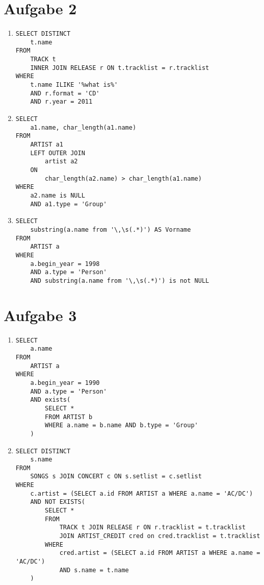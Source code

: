 \documentclass{article}
\begin{document}
    \section*{Aufgabe 2}
    \begin{enumerate}
        \item
            \begin{verbatim}
SELECT DISTINCT
    t.name
FROM
    TRACK t
    INNER JOIN RELEASE r ON t.tracklist = r.tracklist
WHERE
    t.name ILIKE '%what is%'
    AND r.format = 'CD'
    AND r.year = 2011
            \end{verbatim}
        \item
            \begin{verbatim}
SELECT
    a1.name, char_length(a1.name)
FROM
    ARTIST a1
    LEFT OUTER JOIN
        artist a2
    ON
        char_length(a2.name) > char_length(a1.name)
WHERE
    a2.name is NULL
    AND a1.type = 'Group'
            \end{verbatim}
        \item
            \begin{verbatim}
SELECT
    substring(a.name from '\,\s(.*)') AS Vorname
FROM
    ARTIST a
WHERE
    a.begin_year = 1998
    AND a.type = 'Person'
    AND substring(a.name from '\,\s(.*)') is not NULL
            \end{verbatim}
    \end{enumerate}

\section*{Aufgabe 3}
    \begin{enumerate}
        \item
            \begin{verbatim}
SELECT
    a.name
FROM
    ARTIST a
WHERE
    a.begin_year = 1990
    AND a.type = 'Person'
    AND exists(
        SELECT *
        FROM ARTIST b
        WHERE a.name = b.name AND b.type = 'Group'
    )
            \end{verbatim}
        \item
            \begin{verbatim}
SELECT DISTINCT
    s.name
FROM
    SONGS s JOIN CONCERT c ON s.setlist = c.setlist
WHERE
    c.artist = (SELECT a.id FROM ARTIST a WHERE a.name = 'AC/DC')
    AND NOT EXISTS(
        SELECT *
        FROM
            TRACK t JOIN RELEASE r ON r.tracklist = t.tracklist
            JOIN ARTIST_CREDIT cred on cred.tracklist = t.tracklist
        WHERE
            cred.artist = (SELECT a.id FROM ARTIST a WHERE a.name = 'AC/DC')
            AND s.name = t.name
    )
            \end{verbatim}
    \end{enumerate}
\end{document}
